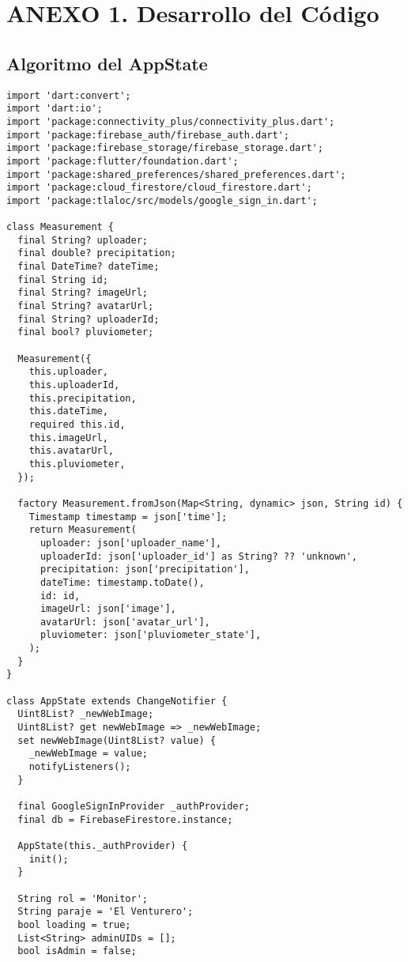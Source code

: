 \chapter{ANEXO 1. Desarrollo del Código}

\section{Algoritmo del AppState}
\label{anexo:alg1}

\begin{verbatim}
import 'dart:convert';
import 'dart:io';
import 'package:connectivity_plus/connectivity_plus.dart';
import 'package:firebase_auth/firebase_auth.dart';
import 'package:firebase_storage/firebase_storage.dart';
import 'package:flutter/foundation.dart';
import 'package:shared_preferences/shared_preferences.dart';
import 'package:cloud_firestore/cloud_firestore.dart';
import 'package:tlaloc/src/models/google_sign_in.dart';

class Measurement {
  final String? uploader;
  final double? precipitation;
  final DateTime? dateTime;
  final String id;
  final String? imageUrl;
  final String? avatarUrl;
  final String? uploaderId;
  final bool? pluviometer;

  Measurement({
    this.uploader,
    this.uploaderId,
    this.precipitation,
    this.dateTime,
    required this.id,
    this.imageUrl,
    this.avatarUrl,
    this.pluviometer,
  });

  factory Measurement.fromJson(Map<String, dynamic> json, String id) {
    Timestamp timestamp = json['time'];
    return Measurement(
      uploader: json['uploader_name'],
      uploaderId: json['uploader_id'] as String? ?? 'unknown',
      precipitation: json['precipitation'],
      dateTime: timestamp.toDate(),
      id: id,
      imageUrl: json['image'],
      avatarUrl: json['avatar_url'],
      pluviometer: json['pluviometer_state'],
    );
  }
}

class AppState extends ChangeNotifier {
  Uint8List? _newWebImage;
  Uint8List? get newWebImage => _newWebImage;
  set newWebImage(Uint8List? value) {
    _newWebImage = value;
    notifyListeners(); 
  }

  final GoogleSignInProvider _authProvider;
  final db = FirebaseFirestore.instance;

  AppState(this._authProvider) {
    init();
  }

  String rol = 'Monitor';
  String paraje = 'El Venturero';
  bool loading = true;
  List<String> adminUIDs = [];
  bool isAdmin = false;


\end{verbatim}
